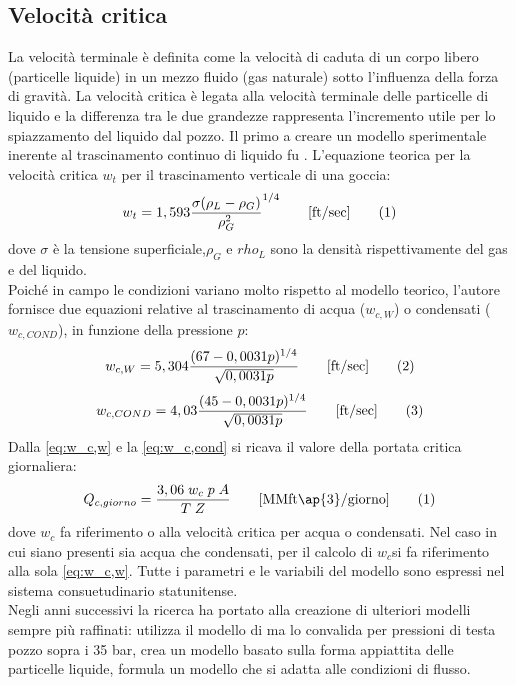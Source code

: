 \subsection{Velocità critica}
La velocità terminale è definita come la velocità di caduta di un corpo libero (particelle liquide) in un mezzo fluido (gas naturale) sotto l'influenza della forza di gravità. La velocità critica è legata alla velocità terminale delle particelle di liquido e la differenza tra le due grandezze rappresenta l'incremento utile per lo spiazzamento del liquido dal pozzo. Il primo a creare un modello sperimentale inerente al trascinamento continuo di liquido fu \textcite{turner1969analysis}. L'equazione teorica per la velocità critica \(w_t\) per il trascinamento verticale di una goccia:
\[w_t= 1,593\dfrac{\sigma{(\rho_L-\rho_G)}}{\rho_G^2}^{1/4} \qquad\textrm{[ft/sec]} \addtag \label{eq:turnerwc} \]
dove \(\sigma\) è la tensione superficiale,\(\rho_G\) e \(rho_L\) sono la densità rispettivamente del gas e del liquido.\\
Poiché in campo le condizioni variano molto rispetto al modello teorico, l'autore fornisce due equazioni relative al trascinamento di acqua (\(w_{c,W}\)) o condensati (\(w_{c,COND}\)), in funzione della pressione \(p\):
\[w_{c,W} = 5,304 \dfrac{(67-0,0031p)^{1/4}}{\sqrt{0,0031p}}  \qquad\textrm{[ft/sec]} \label{eq:w_c,w} \addtag\]
\[w_{c,COND} = 4,03 \dfrac{(45-0,0031p)^{1/4}}{\sqrt{0,0031p}}  \qquad\textrm{[ft/sec]} \label{eq:w_c,cond} \addtag\]
 Dalla \eqref{eq:w_c,w} e la \eqref{eq:w_c,cond} si ricava il valore della portata critica giornaliera:
\[Q_{c,giorno}=\dfrac{3,06 \; w_c \; p \; A}{T \; Z}  \qquad \textrm{[MMft\ap{3}/giorno]} \addtag \]
dove \(w_c\) fa riferimento o alla velocità critica per acqua o condensati. Nel caso in cui siano presenti sia acqua che condensati, per il calcolo di \(w_c\)si fa riferimento alla sola \eqref{eq:w_c,w}. Tutte i parametri e le variabili del modello sono espressi nel sistema consuetudinario statunitense. \\
Negli anni successivi la ricerca ha portato alla creazione di ulteriori modelli sempre più raffinati: \textcite{coleman1991new} utilizza il modello di \citeauthor{turner1969analysis} ma lo convalida per pressioni di testa pozzo sopra i 35 bar, \textcite{li2001new} crea un modello basato sulla forma appiattita delle particelle liquide, \textcite{nosseir1997new} formula un modello che si adatta alle condizioni di flusso.

